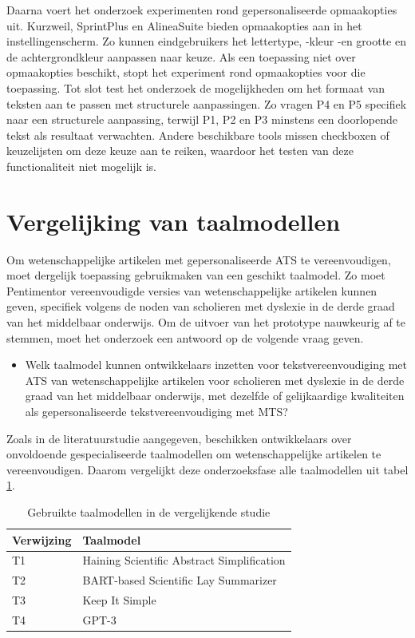 Daarna voert het onderzoek experimenten rond gepersonaliseerde opmaakopties uit. Kurzweil, SprintPlus en AlineaSuite bieden opmaakopties aan in het instellingenscherm. Zo kunnen eindgebruikers het lettertype, -kleur -en grootte en de achtergrondkleur aanpassen naar keuze. Als een toepassing niet over opmaakopties beschikt, stopt het experiment rond opmaakopties voor die toepassing. Tot slot test het onderzoek de mogelijkheden om het formaat van teksten aan te passen met structurele aanpassingen. Zo vragen P4 en P5 specifiek naar een structurele aanpassing, terwijl P1, P2 en P3 minstens een doorlopende tekst als resultaat verwachten. Andere beschikbare tools missen checkboxen of keuzelijsten om deze keuze aan te reiken, waardoor het testen van deze functionaliteit niet mogelijk is.

\section{Vergelijking van taalmodellen}
\label{sec:vergelijkende-studie}

Om wetenschappelijke artikelen met gepersonaliseerde ATS te vereenvoudigen, moet dergelijk toepassing gebruikmaken van een geschikt taalmodel. Zo moet Pentimentor vereenvoudigde versies van wetenschappelijke artikelen kunnen geven, specifiek volgens de noden van scholieren met dyslexie in de derde graad van het middelbaar onderwijs. Om de uitvoer van het prototype nauwkeurig af te stemmen, moet het onderzoek een antwoord op de volgende vraag geven.

\begin{itemize}
	\item Welk taalmodel kunnen ontwikkelaars inzetten voor tekstvereenvoudiging met ATS van wetenschappelijke artikelen voor scholieren met dyslexie in de derde graad van het middelbaar onderwijs, met dezelfde of gelijkaardige kwaliteiten als gepersonaliseerde tekstvereenvoudiging met MTS?
\end{itemize}

Zoals in de literatuurstudie aangegeven, beschikken ontwikkelaars over onvoldoende gespecialiseerde taalmodellen om wetenschappelijke artikelen te vereenvoudigen. Daarom vergelijkt deze onderzoeksfase alle taalmodellen uit tabel \ref{table:vergelijkende-studie-taalmodellen}. 

\begin{center}
	\begin{table}[H]
		\begin{tabular}{ | m{4cm} | m{11cm} | } 
			\hline
			\textbf{Verwijzing} & \textbf{Taalmodel} \\
			\hline
			T1 & Haining Scientific Abstract Simplification \\
			\hline
			T2 & BART-based Scientific Lay Summarizer \\
			\hline
			T3 & Keep It Simple\\
			\hline
			T4 & GPT-3 \\
			\hline
		\end{tabular}
		\caption{Gebruikte taalmodellen in de vergelijkende studie}
		\label{table:vergelijkende-studie-taalmodellen}
	\end{table}
\end{center}

